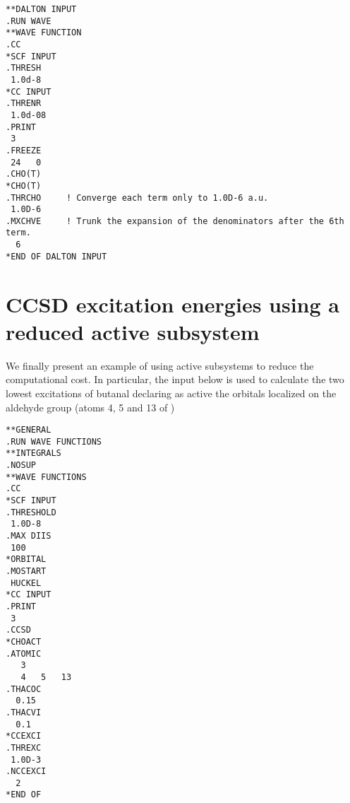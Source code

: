 \begin{verbatim}
**DALTON INPUT
.RUN WAVE
**WAVE FUNCTION
.CC
*SCF INPUT
.THRESH
 1.0d-8
*CC INPUT
.THRENR
 1.0d-08
.PRINT
 3
.FREEZE
 24   0
.CHO(T)
*CHO(T)
.THRCHO     ! Converge each term only to 1.0D-6 a.u.
 1.0D-6
.MXCHVE     ! Trunk the expansion of the denominators after the 6th term.
  6
*END OF DALTON INPUT
\end{verbatim}

\section{CCSD excitation energies using a reduced active subsystem}

We finally present an example of using active subsystems to reduce the 
computational cost. In particular, the input below is used
to calculate the two lowest excitations of
butanal declaring as active the orbitals localized on the aldehyde group 
(atoms 4, 5 and 13 of \molinp)

\begin{verbatim}
**GENERAL
.RUN WAVE FUNCTIONS
**INTEGRALS
.NOSUP
**WAVE FUNCTIONS
.CC
*SCF INPUT
.THRESHOLD
 1.0D-8
.MAX DIIS
 100
*ORBITAL
.MOSTART
 HUCKEL
*CC INPUT
.PRINT
 3
.CCSD
*CHOACT
.ATOMIC
   3
   4   5   13
.THACOC
  0.15
.THACVI
  0.1
*CCEXCI
.THREXC
 1.0D-3
.NCCEXCI
  2
*END OF
\end{verbatim}
